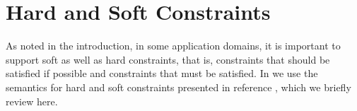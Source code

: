 


\section{Hard and Soft Constraints}
\label{sec:soft-constraint-theory}

As noted in the introduction, in some application domains, it is
important to support soft as well as hard constraints, that is,
constraints that should be satisfied if possible and constraints that
must be satisfied.  In \langname we use the semantics for hard and
soft constraints presented in reference
\cite{borning-lisp-symbolic-computation-1992}, which we briefly
review here.  

